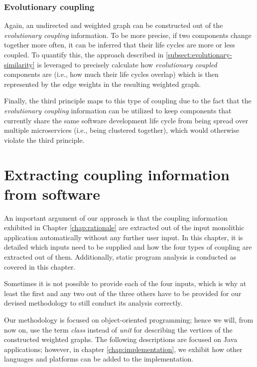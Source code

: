 \documentclass[12pt,a4paper]{report}
\begin{document}
\subsection{Evolutionary coupling}

Again, an undirected and weighted graph can be constructed out of the
\textit{evolutionary coupling} information. To be more precise, if two components
change together more often, it can be inferred that their life cycles are more
or less coupled. To quantify this, the approach described in
\ref{subsect:evolutionary-similarity} is leveraged to precisely calculate how
\textit{evolutionary coupled} components are (i.e., how much their life cycles overlap)
which is then represented by the edge weights in the resulting weighted graph.

Finally, the third principle maps to this type of coupling due to the fact that
the \textit{evolutionary coupling} information can be utilized to keep
components that currently share the same software development life cycle from
being spread over multiple microservices (i.e., being clustered together),
which would otherwise violate the third principle.




\chapter{Extracting coupling information from software} \label{chap:extracting-coupling}

An important argument of our approach is that the coupling information
exhibited in Chapter \ref{chap:rationale} are extracted out of the input
monolithic application automatically without any further user input. In this
chapter, it is detailed which inputs need to be supplied and how the four
types of coupling are extracted out of them. Additionally, static program
analysis is conducted as covered in this chapter.

Sometimes it is not possible to provide each of the four inputs, which is why
at least the first and any two out of the three others have to be provided for
our devised methodology to still conduct its analysis correctly.

Our methodology is focused on object-oriented programming; hence we
will, from now on, use the term \textit{class} instead of \textit{unit} for
describing the vertices of the constructed weighted graphs.
The following descriptions are focused on Java applications; however, in chapter
\ref{chap:implementation}, we exhibit how other languages and platforms can be
added to the implementation.
\end{document}
